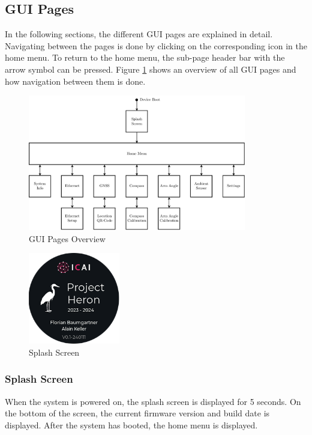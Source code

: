 \subsection{GUI Pages}
In the following sections, the different GUI pages are explained in detail.
Navigating between the pages is done by clicking on the corresponding icon in the home menu.
To return to the home menu, the sub-page header bar with the arrow symbol can be pressed.
Figure \ref{fig:gui_pages_overview} shows an overview of all GUI pages and how navigation between them is done.
\begin{figure}[h!]
	\centering
	\vspace{-0.5cm}
	\includegraphics[width=0.85\textwidth]{images/6_design_final/final_design_gui_pages.pdf}
	\caption{GUI Pages Overview}
	\label{fig:gui_pages_overview}
\end{figure}
\vspace{-0.3cm}

\begin{minipage}{\linewidth}
	\begin{figure}
		\vspace{-0.6cm}
		\includegraphics[width=4cm]{images/6_design_final/gui/00_splash_screen.png}
		\centering
		\caption{Splash Screen}
		\label{fig:final_design_gui_splash_screen}
	\end{figure}
	\subsubsection{Splash Screen}
	When the system is powered on, the splash screen is displayed for 5 seconds.
	On the bottom of the screen, the current firmware version and build date is displayed.
	After the system has booted, the home menu is displayed.
\end{minipage}
\vspace{2.2cm}		%

